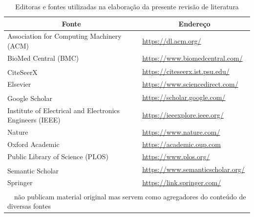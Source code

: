 \documentclass[english,brazilian]{UNISINOSmonografia} %
\newcommand\defaultFigureWidth{0.9}
\begin{document}
\begin{table}[tb]
\centering%
\begin{minipage}{\defaultFigureWidth\textwidth}
	\caption{Editoras e fontes utilizadas na elaboração da presente revisão de literatura}
	\label{tab:survey-sources}
	\vspace{1ex}
	\renewcommand{\tabularxcolumn}[1]{>{\arraybackslash}m{#1}}
	\begin{tabularx}{\textwidth}{Xl@{}}
		\toprule
		\multicolumn{1}{c}{Fonte} & \multicolumn{1}{c}{Endereço} \\ 
		\midrule
		Association for Computing Machinery (ACM) & \url{https://dl.acm.org/} \\
		BioMed Central (BMC) & \url{https://www.biomedcentral.com/} \\
		CiteSeerX\textsuperscript{~\dag} & \url{https://citeseerx.ist.psu.edu/} \\
		Elsevier & \url{https://www.sciencedirect.com/} \\
		Google Scholar\textsuperscript{~\dag} & \url{https://scholar.google.com/} \\
		Institute of Electrical and Electronics Engineers (IEEE) & \url{https://ieeexplore.ieee.org/} \\
		Nature & \url{https://www.nature.com/} \\
		Oxford Academic & \url{https://academic.oup.com} \\
		Public Library of Science (PLOS) & \url{https://www.plos.org/} \\
		Semantic Scholar\textsuperscript{~\dag} & \url{https://www.semanticscholar.org/} \\
		Springer & \url{https://link.springer.com/} \\
		\bottomrule
		\multicolumn{2}{l}{\scriptsize{\textsuperscript{\dag}~~não publicam material original mas servem como agregadores do conteúdo de diversas fontes}}
	\end{tabularx}
\end{minipage}
\end{table}
\end{document}
